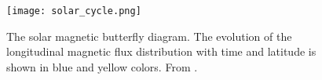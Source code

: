 \documentclass[goettingen, gauss, print]{thesis}
\begin{document}
\begin{figure}[h!]
\centering
\texttt{[image: solar\_cycle.png]}
\caption{The solar magnetic butterfly diagram. The evolution of the longitudinal magnetic flux distribution with time and latitude is shown in blue and yellow colors. From \cite{hathaway_solar_2010}.}
\label{solar_cycle}
\end{figure}
\newpage



\end{document}
